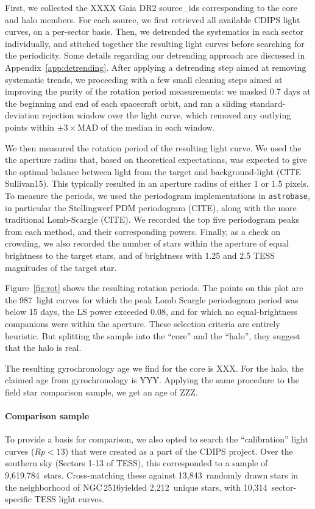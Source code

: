 \documentclass[12pt,twocolumn,tighten]{aastex63}
\newcommand{\cn}{NGC\,2516} %
\newcommand{\nautorot}{987\ } %
\newcommand{\ncalibration}{9{,}619{,}784\ } %
\newcommand{\nnbhd}{13{,}843\ } %
\newcommand{\nnbhdcaliblc}{10{,}314\ } %
\newcommand{\nnbhdcalibstar}{2{,}212\ } %
\begin{document}
First, we collected the XXXX Gaia DR2 source\_ids corresponding to the
core and halo members.  For each source, we first retrieved all
available CDIPS light curves, on a per-sector basis.  Then, we
detrended the systematics in each sector individually, and stitched
together the resulting light curves before searching for the
periodicity.  Some details regarding our detrending approach are
discussed in Appendix~\ref{app:detrending}.  After applying a
detrending step aimed at removing systematic trends, we proceeding
with a few small cleaning steps aimed at improving the purity of the
rotation period measurements: we masked 0.7 days at the beginning and
end of each spacecraft orbit, and ran a sliding standard-deviation
rejection window over the light curve, which removed any outlying
points within $\pm3\times$MAD of the median in each window.

We then measured the rotation period of the resulting light curve.  We
used the the aperture radius that, based on theoretical expectations,
was expected to give the optimal balance between light from the target
and background-light (CITE Sullivan15).  This typically resulted in an
aperture radius of either 1 or 1.5 pixels.  To measure the periods, we
used the periodogram implementations in \texttt{astrobase}, in
particular the Stellingwerf PDM periodogram (CITE), along with the
more traditional Lomb-Scargle (CITE).  We recorded the top five
periodogram peaks from each method, and their corresponding powers.
Finally, as a check on crowding, we also recorded the number of stars
within the aperture of equal brightness to the target stars, and of
brightness with 1.25 and 2.5 TESS magnitudes of the target star.

Figure~\ref{fig:rot} shows the resulting rotation periods.  The points
on this plot are the \nautorot light curves for which the peak Lomb Scargle
periodogram period was below 15 days, the LS power exceeded 0.08, and
for which no equal-brightness companions were within the aperture.  These
selection criteria are entirely heuristic.  
But splitting the sample into the ``core'' and the ``halo'', they
suggest that the halo is real.

The resulting gyrochronology age we find for the core is XXX.
For the halo, the claimed age from gyrochronology is YYY.
Applying the same procedure to the field star comparison sample,
we get an age of ZZZ.

\paragraph{Comparison sample}
To provide a basis for comparison, we also opted to search the
``calibration'' light curves ($Rp<13$) that were created as a part of
the CDIPS project. 
Over the southern sky (Sectors 1-13 of TESS), this corresponded to a sample of \ncalibration stars.
Cross-matching these against \nnbhd randomly drawn stars in the
neighborhood of \cn yielded \nnbhdcalibstar unique stars, with
\nnbhdcaliblc sector-specific TESS light curves.
\end{document}
